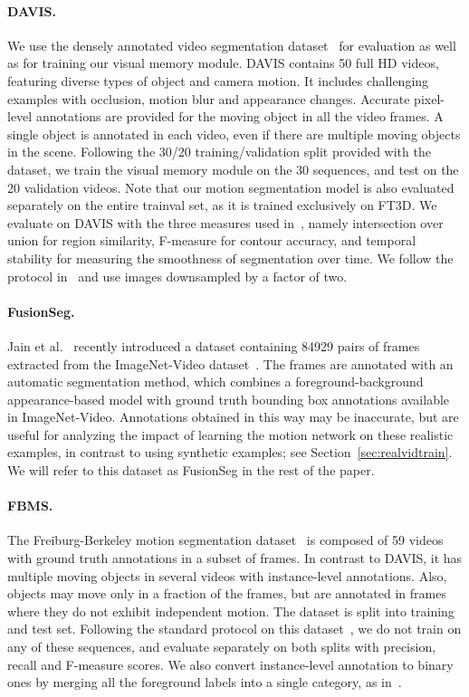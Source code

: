 \paragraph{\bf DAVIS.} We use the densely annotated video segmentation
dataset~\cite{Perazzi16} for evaluation as well as for training our visual
memory module. DAVIS contains 50 full HD videos, featuring diverse types of
object and camera motion. It includes challenging examples with occlusion,
motion blur and appearance changes. Accurate pixel-level annotations are
provided for the moving object in all the video frames. A single object is
annotated in each video, even if there are multiple moving objects in the
scene. Following the 30/20 training/validation split provided with the dataset,
we train the visual memory module on the 30 sequences, and test on the 20
validation videos. Note that our motion segmentation model is also evaluated
separately on the entire trainval set, as it is trained exclusively on FT3D.
We evaluate on DAVIS with the three measures used in~\cite{Perazzi16}, namely
intersection over union for region similarity, F-measure for contour accuracy,
and temporal stability for measuring the smoothness of segmentation over time.
We follow the protocol in~\cite{Perazzi16} and use images downsampled by a
factor of two.

\paragraph{\bf FusionSeg.} Jain et al.~\cite{jain2017fusionseg} recently
introduced a dataset containing 84929 pairs of frames extracted from the
ImageNet-Video dataset~\cite{russakovsky2015imagenet}. The frames are annotated
with an automatic segmentation method, which combines a foreground-background
appearance-based model with ground truth bounding box annotations available in
ImageNet-Video. Annotations obtained in this way may be inaccurate, but are
useful for analyzing the impact of learning the motion network on these
realistic examples, in contrast to using synthetic examples; see
Section~\ref{sec:realvidtrain}. We will refer to this dataset as FusionSeg in
the rest of the paper.

\paragraph{\bf FBMS.} The Freiburg-Berkeley motion segmentation
dataset~\cite{ochs2014segmentation} is composed of 59 videos with ground truth
annotations in a subset of frames.  In contrast to DAVIS, it has multiple
moving objects in several videos with instance-level annotations. Also, objects
may move only in a fraction of the frames, but are annotated in frames where
they do not exhibit independent motion. The dataset is split into training and
test set.  Following the standard protocol on this
dataset~\cite{keuper2015motion}, we do not train on any of these sequences, and
evaluate separately on both splits with precision, recall and F-measure
scores. We also convert instance-level annotation to binary ones by merging all
the foreground labels into a single category, as in~\cite{taylor2015causal}.


